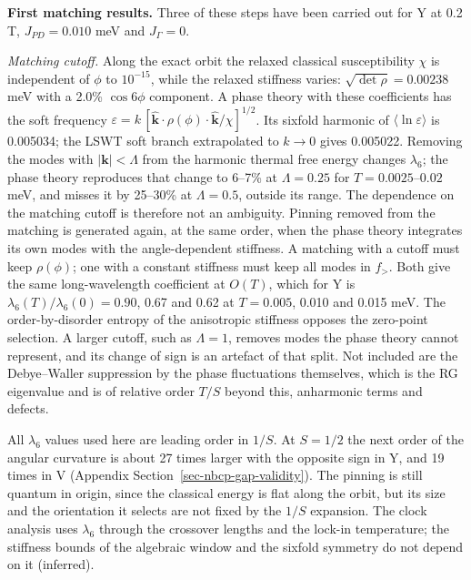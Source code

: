 \label{sec-nbcp-matching-results}\textbf{First matching results.} Three
of these steps have been carried out for Y at 0.2 T,
\(J_{PD}=0.010\) meV and \(J_\Gamma=0\).

\emph{Matching cutoff.} Along the exact orbit the relaxed classical
susceptibility \(\chi\) is independent of \(\phi\) to \(10^{-15}\),
while the relaxed stiffness varies: \(\sqrt{\det\rho}=0.00238\) meV
with a 2.0\% \(\cos6\phi\) component. A phase theory with these
coefficients has the soft frequency
\(\varepsilon=k\,[\hat{\mathbf k}\cdot\rho(\phi)\cdot\hat{\mathbf k}/\chi]^{1/2}\).
Its sixfold harmonic of \(\langle\ln\varepsilon\rangle\) is 0.005034;
the LSWT soft branch extrapolated to \(k\to0\) gives 0.005022. Removing
the modes with \(|\mathbf k|<\Lambda\) from the harmonic thermal free
energy changes \(\lambda_6\); the phase theory reproduces that change
to 6--7\% at \(\Lambda=0.25\) for \(T=0.0025\)--\(0.02\) meV, and
misses it by 25--30\% at \(\Lambda=0.5\), outside its range. The
dependence on the matching cutoff is therefore not an ambiguity. Pinning
removed from the matching is generated again, at the same order, when
the phase theory integrates its own modes with the angle-dependent
stiffness. A matching with a cutoff must keep \(\rho(\phi)\); one with
a constant stiffness must keep all modes in \(f_>\). Both give the same
long-wavelength coefficient at \(O(T)\), which for Y is
\(\lambda_6(T)/\lambda_6(0)=0.90\), 0.67 and 0.62 at \(T=0.005\),
0.010 and 0.015 meV. The order-by-disorder entropy of the anisotropic
stiffness opposes the zero-point selection. A larger cutoff, such as
\(\Lambda=1\), removes modes the phase theory cannot represent, and its
change of sign is an artefact of that split. Not included are the
Debye--Waller suppression by the phase fluctuations themselves, which
is the RG eigenvalue and is of relative order \(T/S\) beyond this,
anharmonic terms and defects.

All \(\lambda_6\) values used here are leading order in \(1/S\). At
\(S=1/2\) the next order of the angular curvature is about 27 times
larger with the opposite sign in Y, and 19 times in V
(Appendix Section~\ref{sec-nbcp-gap-validity}). The pinning is still
quantum in origin, since the classical energy is flat along the orbit,
but its size and the orientation it selects are not fixed by the
\(1/S\) expansion. The clock analysis uses \(\lambda_6\) through the
crossover lengths and the lock-in temperature; the stiffness bounds of
the algebraic window and the sixfold symmetry do not depend on it
(inferred).

